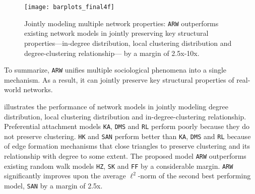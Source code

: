 \begin{figure}
	\centering
	\vspace{-6pt}
	\texttt{[image: barplots\_final4f]}
	\caption{Jointly modeling multiple network properties: \texttt{ARW} outperforms
		existing network models in jointly preserving key structural properties---in-degree
		distribution, local clustering distribution and degree-clustering relationship---
		by a margin of 2.5x-10x.
	}
	\vspace{-8pt}
	\label{fig:barplot}
\end{figure}

To summarize, \texttt{ARW} unifies multiple sociological phenomena
into a single mechanism. As a result, it can jointly preserve key structural
properties of real-world networks.


 illustrates the performance of network models in jointly
modeling degree distribution, local clustering distribution and in-degree-clustering
relationship. Preferential attachment models \texttt{KA}, \texttt{DMS} and
\texttt{RL} perform poorly because they do not preserve clustering. \texttt{HK}
and \texttt{SAN} perform better than \texttt{KA}, \texttt{DMS} and
\texttt{RL} because of edge formation mechanisms that close triangles
to preserve clustering and its relationship with degree to some extent. The proposed
model \texttt{ARW} outperforms existing random walk models \texttt{HZ}, \texttt{SK}
and \texttt{FF} by a considerable margin.
\texttt{ARW} significantly improves upon the average $\ell^2$-norm of the second best performing model,
\texttt{SAN} by a margin of 2.5x.






